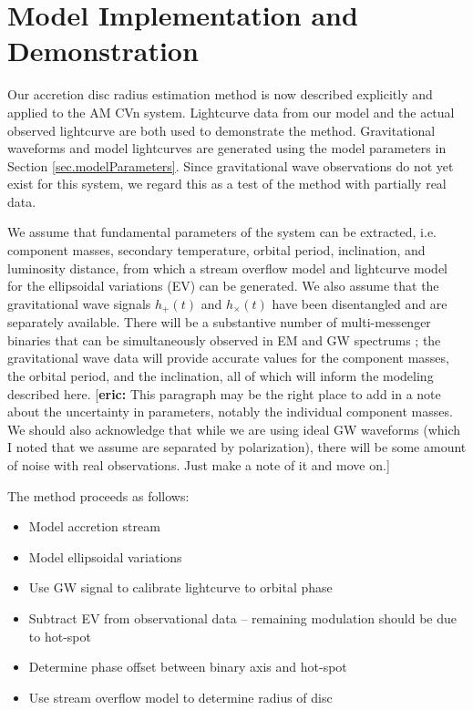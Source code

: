 \documentclass[preprint2]{aastex}
\newcommand{\eric}[1]{{\color{cyan}[\textbf{eric:} #1]}}
\begin{document}
\section{Model Implementation and Demonstration}\label{sec.demon}
Our accretion disc radius estimation method is now described explicitly and applied to the AM CVn system.  Lightcurve data from our model and the actual observed lightcurve \citet{1998ApJ...493L.105H} are both used to demonstrate the method.
Gravitational waveforms and model lightcurves are generated
using the model parameters in Section \ref{sec.modelParameters}.
Since gravitational wave observations do not yet exist for this
system, we regard this as a test of the method with partially real
data.

We assume that fundamental parameters of the system can be extracted,
i.e. component masses, secondary temperature, orbital period,
inclination, and luminosity distance, from which a stream overflow
model and lightcurve model for the ellipsoidal variations (EV) can
be generated. We also assume that the gravitational wave signals
$h_+(t)$ and $h_\times(t)$ have been disentangled and are separately
available. There will be a substantive number of multi-messenger 
binaries that can be simultaneously observed in EM and GW spectrums 
\citep{LLCN2013}; the gravitational wave data will provide accurate 
values for the component masses, the orbital period, and the 
inclination, all of which will inform the modeling described here.
\eric{This paragraph may be the right place to add in a note about the uncertainty in parameters, notably
the individual component masses. We should also acknowledge that while we are using ideal GW waveforms (which I noted that
we assume are separated by polarization), there will be some amount of noise with real observations. Just make a note of it and
move on.}

The method proceeds as follows:
\begin{itemize}
   \item Model accretion stream
   
   \item Model ellipsoidal variations
   
   \item Use GW signal to calibrate lightcurve to orbital phase
   
   \item Subtract EV from observational data -- remaining modulation
   should be due to hot-spot
   
   \item Determine phase offset between binary axis and hot-spot
   
   \item Use stream overflow model to determine radius of disc
\end{itemize}
\end{document}
